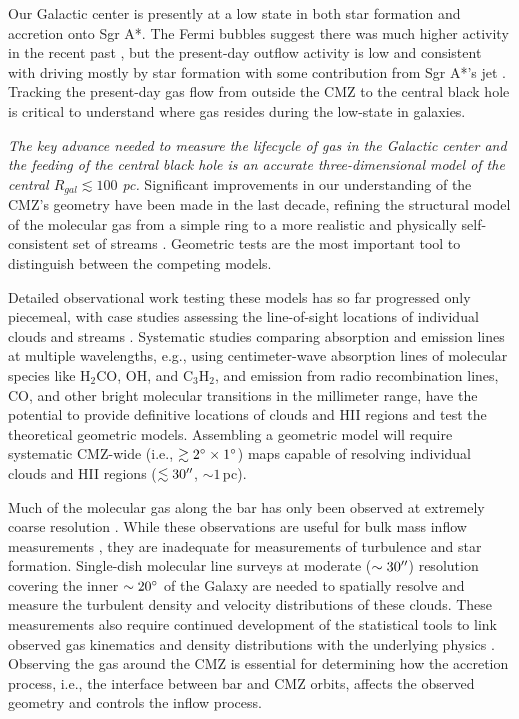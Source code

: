 \documentclass[modern]{aastex62}
\begin{document}
Our Galactic center is presently at a low state in both star formation and
accretion onto Sgr A*.  The Fermi bubbles suggest there was much higher
activity in the recent past \citep{Su2010a}, but the present-day
outflow activity is low and consistent with driving mostly by star formation
\citep{Law2009a,Law2010a} with some contribution from Sgr A*'s jet
\citep{Muno2008a,Li2013f,Zhu2018b}. Tracking the present-day gas flow from outside
the CMZ to the central black hole is critical
to understand where gas resides during the low-state in galaxies.

\textit{The key advance needed to measure the lifecycle of gas in the Galactic
center and the feeding of the central black hole is an accurate
three-dimensional model of the central $R_{gal}\lesssim100$ pc.} Significant improvements in
our understanding
of the CMZ's geometry have been made in the last decade, refining the structural
model of the molecular gas from a simple ring to a more realistic and physically
self-consistent set of streams
\citep{Molinari2011a,Kruijssen2015a,Ridley2017a,Sormani2018a,Kruijssen2019b}.
Geometric tests are the most important tool to distinguish
between the competing models.

Detailed observational work testing these models has so far progressed only
piecemeal, with case studies assessing the line-of-sight locations of
individual clouds and streams \citep[e.g.,][]{Henshaw2016a,Butterfield2018a}.
Systematic studies
comparing absorption and emission lines at multiple wavelengths, e.g., using
centimeter-wave absorption lines of molecular species like H$_2$CO, OH,
and C$_3$H$_2$, and emission from radio recombination lines, CO, and other bright
molecular transitions in the millimeter range, have the potential to provide
definitive locations of clouds and HII regions and test the theoretical
geometric models.  Assembling a geometric model will require systematic
CMZ-wide (i.e., $\gtrsim2^{\circ}\times1^{\circ}$) maps capable of resolving
individual clouds and HII regions ($\lesssim30\mbox{$^{\prime\prime}$}$, $\sim 1\,$pc).  

Much of the molecular gas along the bar has only been observed at extremely
coarse resolution \citep{Dame2001a}. While these observations are useful for
bulk mass inflow measurements \citep[e.g.,][]{Sormani2019a}, they are
inadequate for measurements of turbulence and star formation. Single-dish
molecular line surveys at moderate ($\sim30\mbox{$^{\prime\prime}$}$) resolution covering the
inner $\sim20^{\circ}$ of the Galaxy are needed to spatially resolve and
measure the turbulent
density and velocity distributions of these clouds. These measurements also
require continued development of the statistical tools to link observed gas
kinematics
and density distributions with the underlying physics
\citep{Koch2017a,Burkhart2018a}.  Observing the gas around the CMZ is essential
for determining how the accretion process, i.e., the interface between bar and
CMZ orbits, affects the observed geometry and controls the inflow process.
\end{document}
